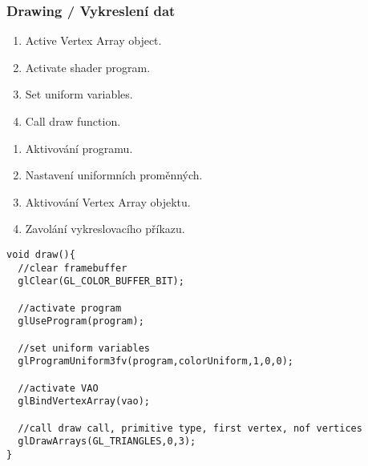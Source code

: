 \begin{frame}[fragile]\frametitle{Drawing / Vykreslení dat}
  \scriptsize
  \begin{enumerate}
  \item Active Vertex Array object.
  \item Activate shader program.
  \item Set uniform variables.
  \item Call draw function.
  \end{enumerate}

  \begin{enumerate}
  \item Aktivování programu.
  \item Nastavení uniformních proměnných.
  \item Aktivování Vertex Array objektu.
  \item Zavolání vykreslovacího příkazu.
  \end{enumerate}
{\scriptsize
\begin{verbatim}
void draw(){
  //clear framebuffer
  glClear(GL_COLOR_BUFFER_BIT);

  //activate program
  glUseProgram(program);

  //set uniform variables
  glProgramUniform3fv(program,colorUniform,1,0,0);

  //activate VAO
  glBindVertexArray(vao);

  //call draw call, primitive type, first vertex, nof vertices
  glDrawArrays(GL_TRIANGLES,0,3);
}
\end{verbatim}
}
\end{frame}

